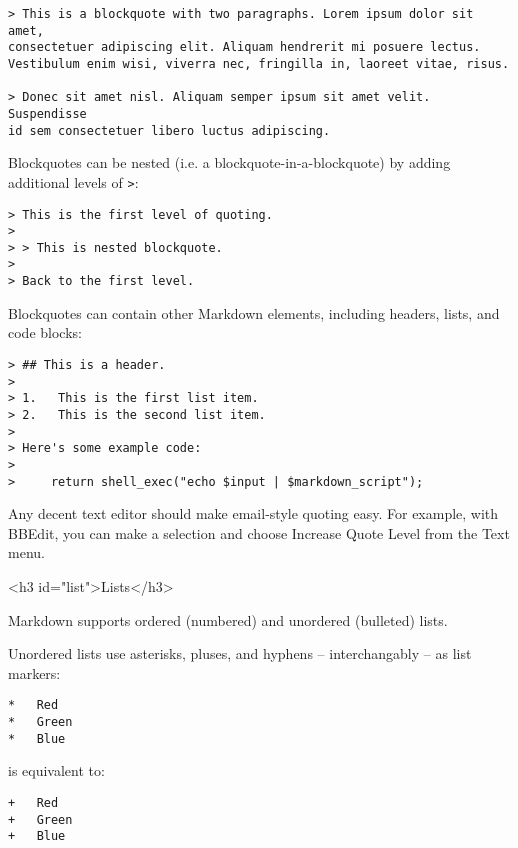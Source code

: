 \begin{lstlisting}
> This is a blockquote with two paragraphs. Lorem ipsum dolor sit amet,
consectetuer adipiscing elit. Aliquam hendrerit mi posuere lectus.
Vestibulum enim wisi, viverra nec, fringilla in, laoreet vitae, risus.

> Donec sit amet nisl. Aliquam semper ipsum sit amet velit. Suspendisse
id sem consectetuer libero luctus adipiscing.
\end{lstlisting}




Blockquotes can be nested (i.e. a blockquote-in-a-blockquote) by
adding additional levels of \texttt{>}:

\begin{lstlisting}
> This is the first level of quoting.
>
> > This is nested blockquote.
>
> Back to the first level.
\end{lstlisting}




Blockquotes can contain other Markdown elements, including headers, lists,
and code blocks:

\begin{lstlisting}
> ## This is a header.
> 
> 1.   This is the first list item.
> 2.   This is the second list item.
> 
> Here's some example code:
> 
>     return shell_exec("echo $input | $markdown_script");
\end{lstlisting}




Any decent text editor should make email-style quoting easy. For
example, with BBEdit, you can make a selection and choose Increase
Quote Level from the Text menu.

<h3 id="list">Lists</h3>



Markdown supports ordered (numbered) and unordered (bulleted) lists.



Unordered lists use asterisks, pluses, and hyphens -- interchangably
-- as list markers:

\begin{lstlisting}
*   Red
*   Green
*   Blue
\end{lstlisting}




is equivalent to:

\begin{lstlisting}
+   Red
+   Green
+   Blue
\end{lstlisting}




